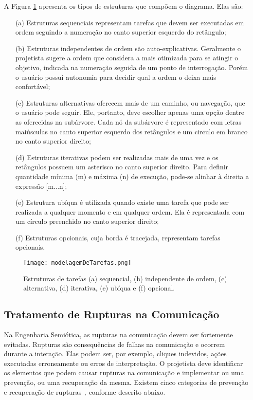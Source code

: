 \indent A Figura \ref{fig:modelagemDeTarefas} apresenta os tipos de estruturas que compõem o diagrama. Elas são:

\begin{itemize}
\item [(a)] Estruturas sequenciais representam tarefas que devem ser executadas em ordem seguindo a numeração no canto superior esquerdo do retângulo;
\item [(b)] Estruturas independentes de ordem são auto-explicativas. Geralmente o projetista sugere a ordem que considera a mais otimizada para se atingir o objetivo, indicada na numeração seguida de um ponto de interrogação. Porém o usuário possui autonomia para decidir qual a ordem o deixa mais confortável;
\item [(c)] Estruturas alternativas oferecem mais de um caminho, ou navegação, que o usuário pode seguir. Ele, portanto, deve escolher apenas uma opção dentre as oferecidas na subárvore. Cada nó da subárvore é representado com letras maiúsculas no canto superior esquerdo dos retângulos e um circulo em branco no canto superior direito;
\item [(d)] Estruturas iterativas podem ser realizadas mais de uma vez e os retângulos possuem um asterisco no canto superior direito. Para definir quantidade mínima (m) e máxima (n) de execução, pode-se alinhar à direita a expressão [m...n]; 
\item [(e)] Estrutura ubíqua é utilizada quando existe uma tarefa que pode ser realizada a qualquer momento e em qualquer ordem. Ela é representada com um círculo preenchido no canto superior direito;
\item [(f)] Estruturas opcionais, cuja borda é tracejada, representam tarefas opcionais.
\end{itemize}
  

\begin{figure}[!h]
    \centering
    \texttt{[image: modelagemDeTarefas.png]}
    \caption{Estruturas de tarefas (a) sequencial, (b) independente de ordem, (c) alternativa, (d) iterativa, (e) ubíqua e (f) opcional.}
    \label{fig:modelagemDeTarefas}
\end{figure} 

\subsection{Tratamento de Rupturas na Comunicação}

\indent Na Engenharia Semiótica, as rupturas na comunicação devem ser fortemente evitadas. Rupturas são consequências de falhas na comunicação e ocorrem durante a interação. Elas podem ser, por exemplo, cliques indevidos, ações executadas erroneamente ou erros de interpretação. O projetista deve identificar os elementos que podem causar rupturas na comunicação e implementar ou uma prevenção, ou uma recuperação da mesma. Existem cinco categorias de prevenção e recuperação de rupturas~\cite{IHCbook}, conforme descrito abaixo.

